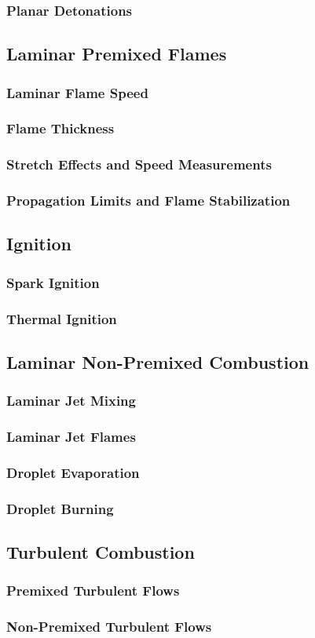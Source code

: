 \documentclass[12pt]{article}
\begin{document}
\subsubsection{Planar Detonations}

\subsection{Laminar Premixed Flames}
\subsubsection{Laminar Flame Speed}
\subsubsection{Flame Thickness}
\subsubsection{Stretch Effects and Speed Measurements}
\subsubsection{Propagation Limits and Flame Stabilization}

\subsection{Ignition}
\subsubsection{Spark Ignition}
\subsubsection{Thermal Ignition}

\subsection{Laminar Non-Premixed Combustion}
\subsubsection{Laminar Jet Mixing}
\subsubsection{Laminar Jet Flames}
\subsubsection{Droplet Evaporation}
\subsubsection{Droplet Burning}

\subsection{Turbulent Combustion}
\subsubsection{Premixed Turbulent Flows}

\subsubsection{Non-Premixed Turbulent Flows}
\end{document}
